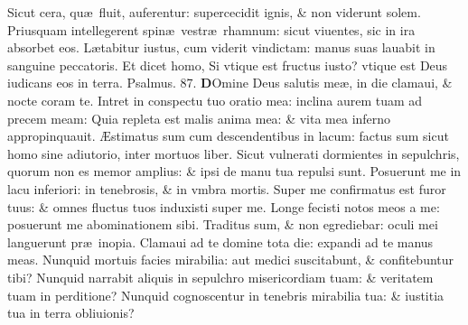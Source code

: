 \documentclass[a5paper,10pt]{book}
\def\ae{æ}
\def\AE{Æ}
\begin{document}
\begin{multicols*}{2}
\newline \color{red} S\color{black}icut cera, qu\ae \ fluit, auferentur: supercecidit ignis, \& non viderunt solem.
\newline \color{red} P\color{black}riusquam intellegerent spin\ae \ vestr\ae \ rhamnum: sicut viuentes, sic in ira absorbet eos.
\newline \color{red} L\color{black}\ae tabitur iustus, cum viderit vindictam: manus suas lauabit in sanguine peccatoris.
\newline \color{red} E\color{black}t dicet homo, Si vtique est fructus iusto? vtique est Deus iudicans eos in terra. \quad \color{red} Psalmus. \hypertarget{ps87}{87.} \color{black}
\vspace{-.25em}
\lettrine[lines=2]{\bfseries \color{red} D}{}Omine Deus salutis me\ae , in die clamaui, \& nocte coram te.
\newline \color{red} I\color{black}ntret in conspectu tuo oratio mea: inclina aurem tuam ad precem meam:
\newline \color{red} Q\color{black}uia repleta est malis anima mea: \& vita mea inferno appropinquauit.
\newline \color{red} \AE\color{black}stimatus sum cum descendentibus in lacum: factus sum sicut homo sine adiutorio, inter mortuos liber.
\newline \color{red} S\color{black}icut vulnerati dormientes in sepulchris, quorum non es memor amplius: \& ipsi de manu tua repulsi sunt.
\newline \color{red} P\color{black}osuerunt me in lacu inferiori: in tenebrosis, \& in vmbra mortis.
\newline \color{red} S\color{black}uper me confirmatus est furor tuus: \& omnes fluctus tuos induxisti super me.
\newline \color{red} L\color{black}onge fecisti notos meos a me: posuerunt me abominationem sibi.
\newline \color{red} T\color{black}raditus sum, \& non egrediebar: oculi mei languerunt pr\ae \ inopia.
\newline \color{red} C\color{black}lamaui ad te domine tota die: expandi ad te manus meas.
\newline \color{red} N\color{black}unquid mortuis facies mirabilia: aut medici suscitabunt, \& confitebuntur tibi?
\newline \color{red} N\color{black}unquid narrabit aliquis in sepulchro misericordiam tuam: \& veritatem tuam in perditione?
\newline \color{red} N\color{black}unquid cognoscentur in tenebris mirabilia tua: \& iustitia tua in terra obliuionis?

\end{multicols*}
\end{document}
